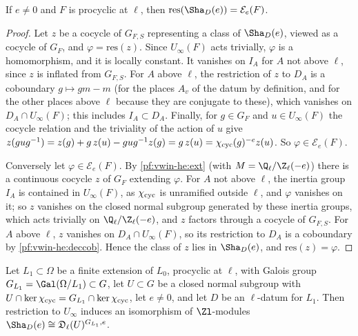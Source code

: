 \begin{lemma}\label{pf:vwin-he:resimage}
If $e\ne0$ and $F$ is procyclic at $\ell$, then $\mathrm{res}(\Sha_D(e))=\mathcal E_e(F)$.
\end{lemma}

\begin{proof}
Let $z$ be a cocycle of $G_{F,S}$ representing a class of $\Sha_D(e)$, viewed as a cocycle of $G_F$, and
$\varphi=\mathrm{res}(z)$. Since $U_\infty(F)$ acts trivially, $\varphi$ is a homomorphism, and it is locally constant.
It vanishes on $I_A$ for $A$ not above $\ell$, since $z$ is inflated from $G_{F,S}$. For $A$ above $\ell$, the
restriction of $z$ to $D_A$ is a coboundary $g\mapsto gm-m$ (for the places $A_v$ of the datum by definition, and for
the other places above $\ell$ because they are conjugate to these), which vanishes on $D_A\cap U_\infty(F)$; this
includes $I_A\subset D_A$. Finally, for $g\in G_F$ and $u\in U_\infty(F)$ the cocycle relation and the triviality of
the action of $u$ give $z(gug^{-1})=z(g)+g\,z(u)-gug^{-1}z(g)=g\,z(u)=\chi_{\mathrm{cyc}}(g)^{-e}z(u)$. So
$\varphi\in\mathcal E_e(F)$.

Conversely let $\varphi\in\mathcal E_e(F)$. By \cref{pf:vwin-he:ext} (with $M=\vwinheQZ(-e)$) there is a continuous
cocycle $z$ of $G_F$ extending $\varphi$. For $A$ not above $\ell$, the inertia group $I_A$ is contained in
$U_\infty(F)$, as $\chi_{\mathrm{cyc}}$ is unramified outside $\ell$, and $\varphi$ vanishes on it; so $z$ vanishes on the closed
normal subgroup generated by these inertia groups, which acts trivially on $\vwinheQZ(-e)$, and $z$ factors through a
cocycle of $G_{F,S}$. For $A$ above $\ell$, $z$ vanishes on $D_A\cap U_\infty(F)$, so its restriction to $D_A$ is a
coboundary by \cref{pf:vwin-he:deccob}. Hence the class of $z$ lies in $\Sha_D(e)$, and $\mathrm{res}(z)=\varphi$.
\end{proof}

\begin{lemma}[Descent]\label{pf:vwin-he:desc}
Let $L_1\subset\Omega$ be a finite extension of $L_0$, procyclic at $\ell$, with Galois group
$G_{L_1}=\Gal(\Omega/L_1)\subset G$, let $U\subset G$ be a closed normal subgroup with
$U\cap\ker\chi_{\mathrm{cyc}}=G_{L_1}\cap\ker\chi_{\mathrm{cyc}}$, let $e\ne0$, and let $D$ be an $\ell$-datum for $L_1$. Then restriction
to $U_\infty$ induces an isomorphism of $\Zl$-modules $\Sha_D(e)\cong\vwinheD_\ell(U)^{G_{L_1},e}$.
\end{lemma}

